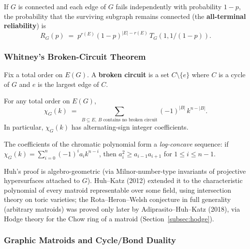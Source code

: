 \begin{theorem}
If $G$ is connected and each edge of $G$ fails independently with
probability $1 - p$, the
probability that the surviving subgraph remains connected (the
\textbf{all-terminal reliability}) is
\[
  R_G(p) \;=\; p^{r(E)} (1 - p)^{|E| - r(E)} \, T_G(1, 1/(1 - p)).
\]
\end{theorem}

\subsubsection{Whitney's Broken-Circuit Theorem}

\begin{definition}
Fix a total order on $E(G)$. A \textbf{broken circuit} is a set
$C \setminus \{e\}$ where $C$ is a cycle of $G$ and $e$ is the largest
edge of $C$.
\end{definition}

\begin{theorem}\label{thm:whitneybc}
For any total order on $E(G)$,
\[
  \chi_G(k) \;=\; \sum_{B \subseteq E,\ B \text{ contains no broken circuit}}
                  (-1)^{|B|}\, k^{n - |B|}.
\]
In particular, $\chi_G(k)$ has alternating-sign integer coefficients.
\end{theorem}

\begin{theorem}[Huh, 2012]
The coefficients of the chromatic polynomial form a \emph{log-concave}
sequence: if $\chi_G(k) = \sum_{i = 0}^{n} (-1)^i a_i k^{n - i}$, then
$a_i^2 \ge a_{i - 1} a_{i + 1}$ for $1 \le i \le n - 1$.
\end{theorem}

Huh's proof is algebro-geometric (via Milnor-number-type invariants of
projective hypersurfaces attached to $G$). Huh--Katz (2012) extended it
to the characteristic polynomial of every matroid representable over
some field, using intersection theory on toric varieties; the
Rota--Heron--Welsh conjecture in full generality (arbitrary matroids)
was proved only later by Adiprasito--Huh--Katz (2018), via Hodge
theory for the Chow ring of a matroid (Section~\ref{subsec:hodge}).

\subsubsection{Graphic Matroids and Cycle/Bond Duality}

